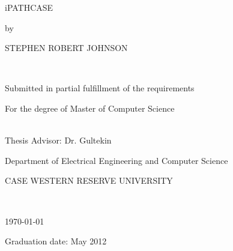 \begin{titlepage}
    \begin{doublespace}
        \begin{center}
            \vspace*{0.5in}

            { \Large iPATHCASE }\\[0.5in]

            { \large by
            
            STEPHEN ROBERT JOHNSON }\\[0.5in]

            { \large Submitted in partial fulfillment of the requirements
            
            For the degree of Master of Computer Science}\\[0.5in]

            { \large Thesis Advisor: Dr. Gultekin \ozsoyoglu}\\[0.5in]

            { \large Department of Electrical Engineering and Computer Science
            
            CASE WESTERN RESERVE UNIVERSITY}\\[0.5in]

            \vfill

            { \large \today
            
            Graduation date: May 2012}\\[0.5in]
        \end{center}
    \end{doublespace}
\end{titlepage}
